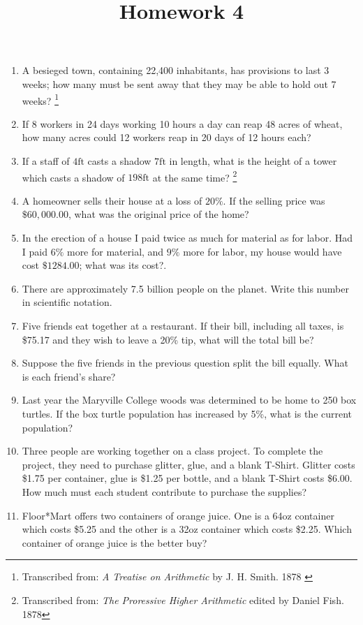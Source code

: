 \documentclass{article}
\title{Homework 4}
\date{}
\begin{document}
\maketitle

\begin{enumerate}
  \item A besieged town, containing 22,400 inhabitants, has provisions to last 3 weeks; how many must be sent away that they may be able to hold out 7 weeks? \footnote{Transcribed from: {\em A Treatise on Arithmetic} by J. H. Smith. 1878 \label{fn:treatise}}
  \item  If 8 workers in 24 days working 10 hours a day can reap 48 acres of wheat, how many acres could 12 workers reap in 20 days of 12 hours each?
  \item If a staff of $4\mathrm{ft}$ casts a shadow $7\mathrm{ft}$ in length, what is the height of a tower which casts a shadow of $198\mathrm{ft}$ at the same time? \footnote{Transcribed from: {\em The Proressive Higher Arithmetic} edited by Daniel Fish. 1878\label{fn:higher}}
  \item A homeowner sells their house at a loss of $20\%$.  If the selling price was 
  $\$60,000.00$, what was the original price of the home?
  \item In the erection of a house I paid twice as much for material as for labor.  Had I paid $6\%$ more for material, and $9\%$ more for labor, my house would have cost $\$1284.00$; what was its cost?\footnotemark[\ref{fn:higher}].
  \item There are approximately 7.5 billion people on the planet.  Write this number in scientific notation.
  \item Five friends eat together at a restaurant.  If their bill, including all taxes,  is \$75.17 and they wish to leave a 20\% tip, what will the total bill be?
  \item Suppose the five friends in the previous question split the bill equally.  What is each friend's share?
  \item Last year the Maryville College woods was determined to be home to 250 box turtles.  If the box turtle population has increased by 5\%, what is the current population?
  \item Three people are working together on a class project.  To complete the project, they need to purchase glitter, glue, and a blank T-Shirt.  Glitter costs \$1.75 per container, glue is \$1.25 per bottle, and a blank T-Shirt costs \$6.00.  How much must each student contribute to purchase the supplies?
  \item Floor*Mart offers two containers of orange juice.  One is a 64oz container which costs \$5.25 and the other is a 32oz container which costs \$2.25.  Which container of orange juice is the better buy?
\end{enumerate}
\end{document}

